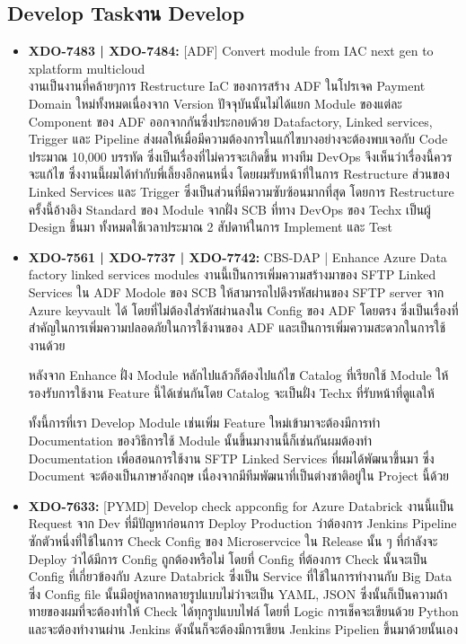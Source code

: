 \subsection{\ifenglish Develop Task\else งาน Develop\fi}
\begin{itemize}
      \item \textbf{XDO-7483 | XDO-7484:} [ADF] Convert module from IAC next gen to xplatform multicloud\\
            งานเป็นงานที่คล้ายๆการ Restructure IaC ของการสร้าง ADF ในโปรเจค Payment Domain ใหม่ทั้งหมดเนื่องจาก Version ปัจจุบันนั้นไม่ได้แยก Module ของแต่ละ Component ของ ADF ออกจากกันซึ่งประกอบด้วย Datafactory, Linked services, Trigger และ Pipeline ส่งผลให้เมื่อมีความต้องการในแก้ไขบางอย่างจะต้องพบเจอกับ Code ประมาณ 10,000 บรรทัด ซึ่งเป็นเรื่องที่ไม่ควรจะเกิดขึ้น ทางทีม DevOps จึงเห็นว่าเรื่องนี้ควรจะแก้ไข ซึ่งงานนี้ผมได้ทำกับพี่เลี้ยงอีกคนหนึ่ง โดยผมรับหน้าที่ในการ Restructure ส่วนของ Linked Services และ Trigger ซึ่งเป็นส่วนที่มีความซับซ้อนมากที่สุด โดยการ Restructure ครั้งนี้อ้างอิง Standard ของ Module จากฝั่ง SCB ที่ทาง DevOps ของ Techx เป็นผู้ Design ขึ้นมา ทั้งหมดใช้เวลาประมาณ 2 สัปดาห์ในการ Implement และ Test
      \item \textbf{XDO-7561 | XDO-7737 | XDO-7742:} CBS-DAP | Enhance Azure Data factory linked services modules
            งานนี้เป็นการเพิ่มความสร้างมาของ SFTP Linked Services ใน ADF Modole ของ SCB ให้สามารถไปดึงรหัสผ่านของ SFTP server จาก Azure keyvault ได้ โดยที่ไม่ต้องใส่รหัสผ่านลงใน Config ของ ADF โดยตรง ซึ่งเป็นเรื่องที่สำคัญในการเพิ่มความปลอดภัยในการใช้งานของ ADF และเป็นการเพิ่มความสะดวกในการใช้งานด้วย

            หลังจาก Enhance ฝั่ง Module หลักไปแล้วก็ต้องไปแก้ไข Catalog ที่เรียกใช้ Module ให้รองรับการใช้งาน Feature นี้ได้เช่นกันโดย Catalog จะเป็นฝั่ง Techx ที่รับหน้าที่ดูแลให้

            ทั้งนี้การที่เรา Develop Module เช่นเพิ่ม Feature ใหม่เข้ามาจะต้องมีการทำ Documentation ของวิธีการใช้ Module นั้นขึ้นมางานนี้ก็เช่นกันผมต้องทำ Documentation เพื่อสอนการใช้งาน SFTP Linked Services ที่ผมได้พัฒนาขึ้นมา ซึ่ง Document จะต้องเป็นภาษาอังกฤษ เนื่องจากมีทีมพัฒนาที่เป็นต่างชาติอยู่ใน Project นี้ด้วย
      \item \textbf{XDO-7633:} [PYMD] Develop check appconfig for Azure Databrick
            งานนี้เเป็น Request จาก Dev ที่มีปัญหาก่อนการ Deploy Production ว่าต้องการ Jenkins Pipeline ซักตัวหนึ่งที่ใช้ในการ Check Config ของ Microservcice ใน Release นั้น ๆ ที่กำลังจะ Deploy ว่าได้มีการ Config ถูกต้องหรือไม่ โดยที่ Config ที่ต้องการ Check นั้นจะเป็น Config ที่เกี่ยวข้องกับ Azure Databrick ซึ่งเป็น Service ที่ใช้ในการทำงานกับ Big Data ซึ่ง Config file นั้นมีอยู๋หลากหลายรูปแบบไม่ว่าจะเป็น YAML, JSON ซึ่งนั้นก็เป็นความถ้าทายของผมที่จะต้องทำให้ Check ได้ทุกรูปแบบไฟล์ โดยที่ Logic การเช็คจะเขียนด้วย Python และจะต้องทำงานผ่าน Jenkins ดังนั้นก็จะต้องมีการเขียน Jenkins Pipelien ขึ้นมาด้วยนั้นเอง
\end{itemize}

